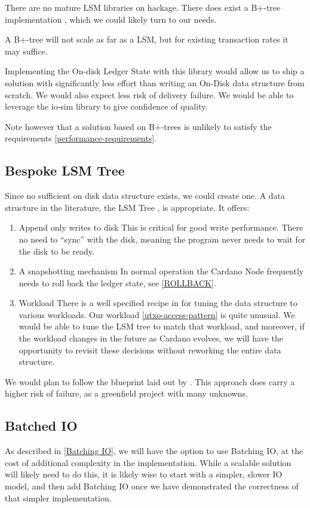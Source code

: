 \documentclass[11pt,a4paper]{article}
\begin{document}
There are no mature LSM libraries on hackage. There does exist a B+-tree
implementation ,
which we could likely turn to our needs.

A B+-tree will not scale as far as a LSM, but for existing transaction rates it
may suffice.

Implementing the On-disk Ledger State with this library would allow us to ship a
solution with significantly less effort than writing an On-Disk data structure
from scratch. We would also expect less risk of delivery failure. We would be
able to leverage the io-sim library to give confidence of quality.

Note however that a solution based on B+-trees is unlikely to satisfy the
requirements \ref{performance-requirements}.

\subsection{Bespoke LSM Tree}

Since no sufficient on disk data structure exists, we could create one. A data
structure in the literature, the LSM Tree \cite{monkey}, is appropriate. It offers:

\begin{enumerate}
  \item Append only writes to disk
        This is critical for good write performance. There no need to ``sync''
        with the disk, meaning the program never needs to wait for the disk to be ready.
  \item A snapshotting mechanism
        In normal operation the Cardano Node frequently needs to roll back the
        ledger state, see \ref{ROLLBACK}.
  \item Workload
        There is a  well specified recipe in \cite{monkey} for tuning  the data
        structure to various workloads. Our workload \ref{utxo-access-pattern} is quite unusual. We
        would be able to tune the LSM tree to match that workload, and moreover, if the
        workload changes in the future as Cardano evolves, we will have the opportunity
        to revisit these decisions without reworking the entire data structure.
\end{enumerate}

We would plan to follow the blueprint laid out by \cite{monkey}. This approach
does carry a higher risk of failure, as a greenfield project with many unknowns.

\subsection{Batched IO}
As described in \ref{Batching IO}, we will have the option to use Batching IO,
at the cost of additional complexity in the implementation. While a scalable
solution will likely need to do this, it is likely wise to start with a simpler,
slower IO model, and then add Batching IO once we have demonstrated the
correctness of that simpler implementation.
\end{document}
